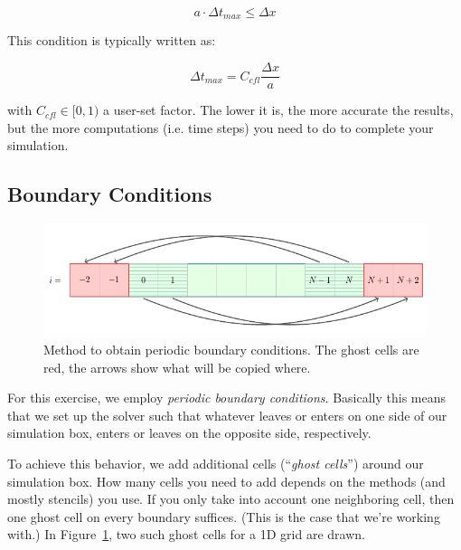 \begin{equation}
	a \cdot \Delta t_{max} \leq \Delta x
\end{equation}

This condition is typically written as:

\begin{equation}
	\Delta t_{max} = C_{cfl} \frac{\Delta x}{a} \label{eq:CFL1D}
\end{equation}

with $C_{cfl} \in [0, 1) $ a user-set factor.
The lower it is, the more accurate the results, but the more computations
(i.e. time steps) you need to do to complete your simulation.






\subsection{Boundary Conditions}\label{chap:boundary-conditions}


\begin{figure}[htbp]
	\includegraphics[width=\textwidth]{./figures/boundary_periodic.pdf}%
	\caption{\label{fig:boundary_periodic}
		Method to obtain periodic boundary conditions.
		The ghost cells are red, the arrows show what will be copied where.
	}
\end{figure}



For this exercise, we employ \emph{periodic boundary conditions}. Basically this means
that we set up the solver such that whatever leaves or enters on one side of our simulation
box, enters or leaves on the opposite side, respectively.

To achieve this behavior, we add additional cells (``\emph{ghost cells}'') around our simulation box.
How many cells you need to add depends on the methods (and mostly stencils) you use.
If you only take into account one neighboring cell, then one ghost cell on every boundary suffices.
(This is the case that we're working with.)
In Figure~\ref{fig:boundary_periodic}, two such ghost cells for a 1D grid are drawn.

